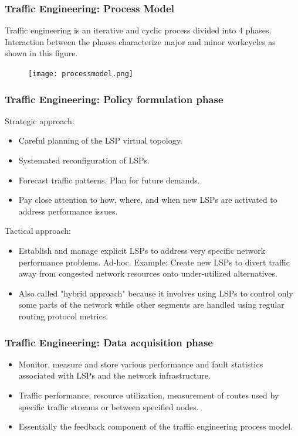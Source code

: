 \documentclass[12pt]{beamer}
\begin{document}
\begin{frame}
  \frametitle{Traffic Engineering: Process Model}
  Traffic engineering is an iterative and cyclic process divided into 4 phases. Interaction between the phases characterize major and minor workcycles as shown in this figure.
  \begin{figure}[h]
    \begin{center}
      \texttt{[image: processmodel.png]}
    \end{center}
  \end{figure}
\end{frame}

\begin{frame}
  \frametitle{Traffic Engineering: Policy formulation phase}
    Strategic approach:
    \begin{itemize}
      \item Careful planning of the LSP virtual topology.
      \item Systemated reconfiguration of LSPs.
      \item Forecast traffic patterns. Plan for future demands.
      \item Pay close attention to how, where, and when new LSPs are activated to address performance issues.
    \end{itemize}

    Tactical approach:
    \begin{itemize}
      \item Establish and manage explicit LSPs to address very specific network performance problems. Ad-hoc. Example: Create new LSPs to divert traffic away from congested network resources onto under-utilized alternatives.
      \item Also called "hybrid approach" because it involves using LSPs to control only some parts of the network while other segments are handled using regular routing protocol metrics.
    \end{itemize}
\end{frame}

\begin{frame}
  \frametitle{Traffic Engineering: Data acquisition phase}
    \begin{itemize}
      \item Monitor, measure and store various performance and fault statistics associated with LSPs and the network infrastructure.
      \item Traffic performance, resource utilization, measurement of routes used by specific traffic streams or between specified nodes.
      \item Essentially the feedback component of the traffic engineering process model.
    \end{itemize}
\end{frame}
\end{document}

